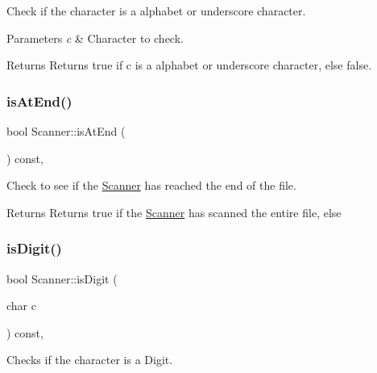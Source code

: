 Check if the character is a alphabet or underscore character. 


\begin{DoxyParams}{Parameters}
{\em c} & Character to check. \\
\hline
\end{DoxyParams}
\begin{DoxyReturn}{Returns}
Returns true if c is a alphabet or underscore character, else false. 
\end{DoxyReturn}
\mbox{\label{class_scanner_a886d66bcf9d8edd27f46f14f6df3c144}} 
\subsubsection{\texorpdfstring{is\+At\+End()}{isAtEnd()}}
{\footnotesize\ttfamily bool Scanner\+::is\+At\+End (\begin{DoxyParamCaption}{ }\end{DoxyParamCaption}) const\hspace{0.3cm}{\ttfamily [inline]}, {\ttfamily [private]}}



Check to see if the \hyperlink{class_scanner}{Scanner} has reached the end of the file. 

\begin{DoxyReturn}{Returns}
Returns true if the \hyperlink{class_scanner}{Scanner} has scanned the entire file, else 
\end{DoxyReturn}
\mbox{\label{class_scanner_aa57431c2670899fefef67a7a7b307bd5}} 
\subsubsection{\texorpdfstring{is\+Digit()}{isDigit()}}
{\footnotesize\ttfamily bool Scanner\+::is\+Digit (\begin{DoxyParamCaption}\item[{char}]{c }\end{DoxyParamCaption}) const\hspace{0.3cm}{\ttfamily [inline]}, {\ttfamily [private]}}



Checks if the character is a Digit. 


